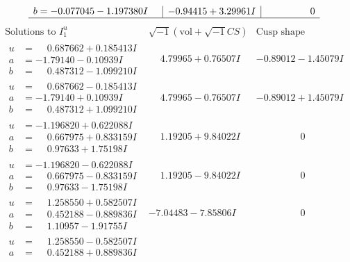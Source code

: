 \documentclass[1p]{elsarticle_modified}
\theoremstyle{definition}
\newcommand{\I}{\sqrt{-1}}
\begin{document}
$$\begin{array}{c|c|c}
\begin{aligned}
b &= -0.077045 - 1.197380 I\end{aligned}
 & -0.94415 + 3.29961 I & \phantom{-0.000000 } 0\\
 \hline 
 \end{array}$$\newpage$$\begin{array}{c|c|c}  
\text{Solutions to }I^u_{1}& \I (\text{vol} + \sqrt{-1}CS) & \text{Cusp shape}\\
 \hline 
\begin{aligned}
u &= \phantom{-}0.687662 + 0.185413 I \\
a &= -1.79140 - 0.10939 I \\
b &= \phantom{-}0.487312 - 1.099210 I\end{aligned}
 & \phantom{-}4.79965 + 0.76507 I & -0.89012 - 1.45079 I \\ \hline\begin{aligned}
u &= \phantom{-}0.687662 - 0.185413 I \\
a &= -1.79140 + 0.10939 I \\
b &= \phantom{-}0.487312 + 1.099210 I\end{aligned}
 & \phantom{-}4.79965 - 0.76507 I & -0.89012 + 1.45079 I \\ \hline\begin{aligned}
u &= -1.196820 + 0.622088 I \\
a &= \phantom{-}0.667975 + 0.833159 I \\
b &= \phantom{-}0.97633 + 1.75198 I\end{aligned}
 & \phantom{-}1.19205 + 9.84022 I & \phantom{-0.000000 } 0 \\ \hline\begin{aligned}
u &= -1.196820 - 0.622088 I \\
a &= \phantom{-}0.667975 - 0.833159 I \\
b &= \phantom{-}0.97633 - 1.75198 I\end{aligned}
 & \phantom{-}1.19205 - 9.84022 I & \phantom{-0.000000 } 0 \\ \hline\begin{aligned}
u &= \phantom{-}1.258550 + 0.582507 I \\
a &= \phantom{-}0.452188 - 0.889836 I \\
b &= \phantom{-}1.10957 - 1.91755 I\end{aligned}
 & -7.04483 - 7.85806 I & \phantom{-0.000000 } 0 \\ \hline\begin{aligned}
u &= \phantom{-}1.258550 - 0.582507 I \\
a &= \phantom{-}0.452188 + 0.889836 I \\

\end{aligned}
\end{array}$$
\end{document}
